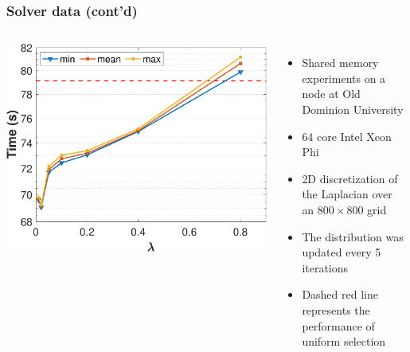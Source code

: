 \documentclass{beamer}
\begin{document}
\begin{frame}
	\frametitle{Solver data (cont'd)}
       \begin{columns}
             \centering
             \includegraphics[width=\linewidth]{images/expoDist_calcTimes_all_1tbr.pdf}
              \begin{itemize}
                  \item Shared memory experiments on a node at Old Dominion University
                  \item 64 core Intel Xeon Phi
                  \item 2D discretization of the Laplacian over an $800 \times 800$ grid
                  \item The distribution was updated every 5 iterations
                  \item Dashed red line represents the performance of uniform selection
              \end{itemize}
         \end{columns}
\end{frame}



\end{document}
